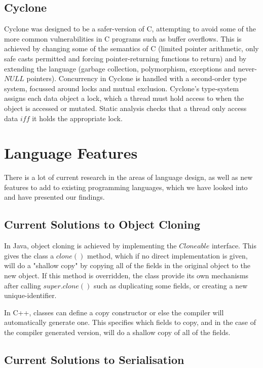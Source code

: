 \documentclass[pdftex,11pt,a4paper]{report}
\begin{document}
\subsection{Cyclone}
\label{sec:cyclone}

Cyclone was designed to be a safer-version of C, attempting to avoid some of the more common vulnerabilities in C programs such as buffer overflows.
This is achieved by changing some of the semantics of C (limited pointer arithmetic, only safe casts permitted and forcing pointer-returning functions to return) and by extending the language (garbage collection, polymorphism, exceptions and never-$NULL$ pointers).
Concurrency in Cyclone is handled with a second-order type system, focussed around locks and mutual exclusion.
Cyclone's type-system assigns each data object a lock, which a thread must hold access to when the object is accessed or mutated.
Static analysis checks that a thread only access data $iff$ it holds the appropriate lock.

\newpage
\section{Language Features}

There is a lot of current research in the areas of language design, as well as new features to add to existing programming languages, which we have looked into and have presented our findings.

\subsection{Current Solutions to Object Cloning}

In Java, object cloning is achieved by implementing the $Cloneable$ interface\cite{java-cloneable}. This gives the class a $clone()$ method, which if no direct implementation is given, will do a "shallow copy" by copying all of the fields in the original object to the new object.
If this method is overridden, the class provide its own mechanisms after calling $super.clone()$ such as duplicating some fields, or creating a new unique-identifier.

In C++, classes can define a copy constructor or else the compiler will automatically generate one\cite{ansi:03:c++}. This specifies which fields to copy, and in the case of the compiler generated version, will do a shallow copy of all of the fields.

\subsection{Current Solutions to Serialisation}
\end{document}
